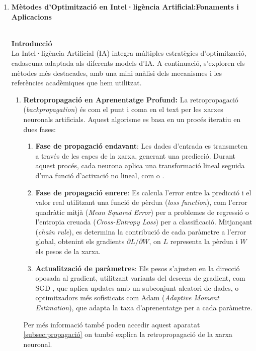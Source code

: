 \begin{enumerate}
   \item \hypertarget{Optimització i Ajustos}{\textbf{Mètodes d'Optimització en Intel·ligència Artificial:Fonaments i Aplicacions}}\\
   \textbf{Introducció}\\
La Intel·ligència Artificial (IA) integra múltiples estratègies d'optimització, cadascuna adaptada als diferents models d'IA. A continuació, s'exploren els mètodes més destacades, amb una mini anàlisi dels mecanismes i les referències acadèmiques que hem utilitzat.

\begin{enumerate}
 \item \textbf{Retropropagació en Aprenentatge Profund:} La retropropagació (\textit{backpropagation}) és com el punt i coma en el text per les xarxes neuronals artificials. Aquest algorisme es basa en un procés iteratiu en dues fases:
    \begin{enumerate}
     \item \textbf{Fase de propagació endavant}: Les dades d'entrada es transmeten a través de les capes de la xarxa, generant una predicció. Durant aquest procés, cada neurona aplica una transformació lineal seguida d'una funció d'activació no lineal, com \textit{} o \textit{}.

     \item \textbf{Fase de propagació enrere}: Es calcula l'error entre la predicció i el valor real utilitzant una funció de pèrdua (\textit{loss function}), com l'error quadràtic mitjà (\textit{Mean Squared Error}) per a problemes de regressió o l'entropia creuada (\textit{Cross-Entropy Loss}) per a classificació. Mitjançant  (\textit{chain rule}), es determina la contribució de cada paràmetre a l'error global, obtenint els gradients $\partial L/\partial W$, on $L$ representa la pèrdua i $W$ els pesos de la xarxa.

     \item \textbf{Actualització de paràmetres}: Els pesos s'ajusten en la direcció oposada al gradient, utilitzant variants del descens de gradient, com SGD \textit{}, que aplica updates amb un subconjunt aleatori de dades, o optimitzadors més sofisticats com Adam (\textit{Adaptive Moment Estimation}), que adapta la taxa d'aprenentatge per a cada paràmetre.
    \end{enumerate}
 Per més informació també podeu accedir aquest  aparatat \ref{subsec:propagació} on també explica la retropropagació de la xarxa neuronal.


\end{enumerate}
\end{enumerate}
